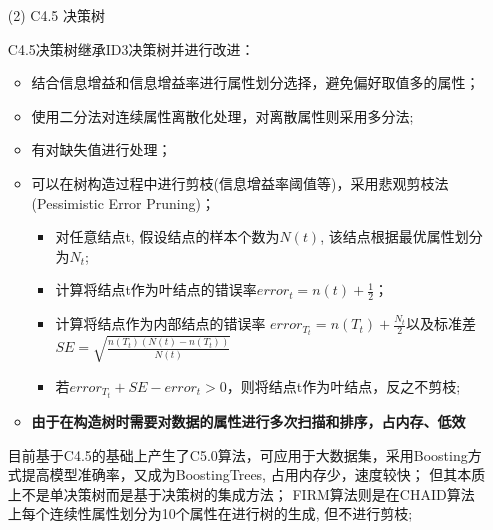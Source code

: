 \documentclass[a4paper]{article}
\begin{document}
\begin{enumerate}
\begin{itemize}
				\item[(2)] C4.5 决策树\par
					C4.5决策树继承ID3决策树并进行改进：
					\begin{itemize}
						\item 结合信息增益和信息增益率进行属性划分选择，避免偏好取值多的属性；
						\item 使用二分法对连续属性离散化处理，对离散属性则采用多分法; 
						\item 有对缺失值进行处理；
						\item 可以在树构造过程中进行剪枝(信息增益率阈值等)，采用悲观剪枝法(Pessimistic Error Pruning)；
							\begin{itemize}
								\item 对任意结点t, 假设结点的样本个数为$N(t)$, 该结点根据最优属性划分为$N_t$;
								\item 计算将结点t作为叶结点的错误率$error_t = n(t) +\frac{1}{2}$；
								\item 计算将结点作为内部结点的错误率 $error_{T_t} = n(T_t)+\frac{N_t}{2}$以及标准差$SE = \sqrt{\frac{n(T_t)(N(t)-n(T_t))}{N(t)}}$
								\item 若$error_{T_t}+SE - error_t>0$，则将结点t作为叶结点，反之不剪枝;
							\end{itemize} 
						\item \textbf{由于在构造树时需要对数据的属性进行多次扫描和排序，占内存、低效}
					\end{itemize}
					目前基于C4.5的基础上产生了C5.0算法，可应用于大数据集，采用Boosting方式提高模型准确率，又成为BoostingTrees, 占用内存少，速度较快；
					但其本质上不是单决策树而是基于决策树的集成方法；
					FIRM算法则是在CHAID算法上每个连续性属性划分为10个属性在进行树的生成, 但不进行剪枝;


\end{itemize}
\end{enumerate}
\end{document}
